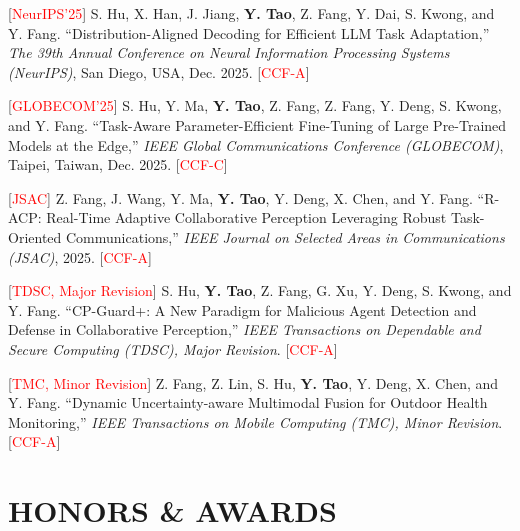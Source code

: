 \documentclass[letterpaper,11pt]{article}
\begin{document}
{{{{{{\begin{justify}
    \normalsize
    [\textcolor{red}{NeurIPS'25}] S. Hu, X. Han, J. Jiang, \textbf{Y. Tao}, Z. Fang, Y. Dai, S. Kwong, and Y. Fang. ``Distribution-Aligned Decoding for Efficient LLM Task Adaptation,'' \textit{The 39th Annual Conference on Neural Information Processing Systems (NeurIPS)}, San Diego, USA, Dec. 2025. [\textcolor{red}{CCF-A}]
\end{justify}

\begin{justify}
    \normalsize
    [\textcolor{red}{GLOBECOM'25}] S. Hu, Y. Ma, \textbf{Y. Tao}, Z. Fang, Z. Fang, Y. Deng, S. Kwong, and Y. Fang. ``Task-Aware Parameter-Efficient Fine-Tuning of Large Pre-Trained Models at the Edge,'' \textit{IEEE Global Communications Conference (GLOBECOM)}, Taipei, Taiwan, Dec. 2025. [\textcolor{red}{CCF-C}]
\end{justify}

\begin{justify}
    \normalsize
    [\textcolor{red}{JSAC}] Z. Fang, J. Wang, Y. Ma, \textbf{Y. Tao}, Y. Deng, X. Chen, and Y. Fang. ``R-ACP: Real-Time Adaptive Collaborative Perception Leveraging Robust Task-Oriented Communications,'' \textit{IEEE Journal on Selected Areas in Communications (JSAC)}, 2025. [\textcolor{red}{CCF-A}]
\end{justify}

\begin{justify}
    \normalsize
    [\textcolor{red}{TDSC, Major Revision}] S. Hu, \textbf{Y. Tao}, Z. Fang, G. Xu, Y. Deng, S. Kwong, and Y. Fang. ``CP-Guard+: A New Paradigm for Malicious Agent Detection and Defense in Collaborative Perception,'' \textit{IEEE Transactions on Dependable and Secure Computing (TDSC), Major Revision}. [\textcolor{red}{CCF-A}]
\end{justify}

\begin{justify}
    \normalsize
    [\textcolor{red}{TMC, Minor Revision}] Z. Fang, Z. Lin, S. Hu, \textbf{Y. Tao}, Y. Deng, X. Chen, and Y. Fang. ``Dynamic Uncertainty-aware Multimodal Fusion for Outdoor Health Monitoring,'' \textit{IEEE Transactions on Mobile Computing (TMC), Minor Revision}. [\textcolor{red}{CCF-A}]
\end{justify}

\section{\textbf{HONORS \& AWARDS}}
\vspace{2mm}

}}}}}}
\end{document}
